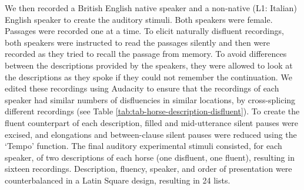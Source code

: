 \documentclass[
  man,floatsintext]{apa7}
\begin{document}
We then recorded a British English native speaker and a non-native (L1: Italian) English speaker to create the auditory stimuli. Both speakers were female. Passages were recorded one at a time. To elicit naturally disfluent recordings, both speakers were instructed to read the passages silently and then were recorded as they tried to recall the passage from memory. To avoid differences between the descriptions provided by the speakers, they were allowed to look at the descriptions as they spoke if they could not remember the continuation. We edited these recordings using Audacity to ensure that the recordings of each speaker had similar numbers of disfluencies in similar locations, by cross-splicing different recordings (see Table \ref{tab:tab-horse-description-disfluent}). To create the fluent counterpart of each description, filled and mid-utterance silent pauses were excised, and elongations and between-clause silent pauses were reduced using the `Tempo' function. The final auditory experimental stimuli consisted, for each speaker, of two descriptions of each horse (one disfluent, one fluent), resulting in sixteen recordings. Description, fluency, speaker, and order of presentation were counterbalanced in a Latin Square design, resulting in 24 lists.
\end{document}
